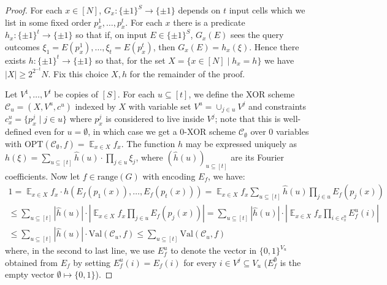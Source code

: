 \documentclass[11pt]{article}
\newcommand{\B}{\{0,1\}}
\newcommand{\rng}{\mathrm{range}}
\newcommand{\E}{\mathop{\mathbb{E}}}
\newcommand{\Opt}{\mathrm{OPT}}
\newcommand{\N}{[N]}
\begin{document}
\begin{proof}
For each $x \in \N$, $G_x: \{\pm 1\}^S \to \{\pm 1\}$ depends on $t$ input cells which we list in some fixed order $p_x^1,\ldots,p_x^t$. For each $x$ there is a predicate $h_x: \{\pm 1\}^t \to \{\pm 1\}$ so that if, on input $E \in \{\pm 1\}^S$, $G_x(E)$ sees the query outcomes $\xi_1 =E(p^1_x),\ldots, \xi_t=E(p_x^t)$, then $G_x(E) = h_x(\xi)$. Hence there exists $h: \{\pm 1\}^t \to \{\pm 1\}$ so that, for the set $X = \{ x\in \N\mid h_x = h\}$ we have $|X| \geq 2^{2^{-t}}N$. Fix this choice $X,h$ for the remainder of the proof.

Let $V^1,\ldots,V^t$ be copies of $[S]$. For each $u \subseteq [t]$, we define the XOR scheme $\mathcal{C}_u = (X,V^u,c^u)$ indexed by $X$ with variable set $V^u=\cup_{j \in u} V^j$ and constraints $c^u_x = \{p^j_x \mid j \in u\}$ where $p^j_x$ is considered to live inside $V^j$; note that this is well-defined even for $u = \emptyset$, in which case we get a $0$-XOR scheme $\mathcal{C}_\emptyset$ over 0 variables with $\Opt(\mathcal{C}_\emptyset,f) = \E_{x \in X} f_x$. The function $h$ may be expressed uniquely as $h(\xi)= \sum_{u \subseteq [t]} \hat{h}(u) \cdot \prod_{ j \in u} \xi_j$, where $(\hat{h}(u))_{u \subseteq [t]}$ are its Fourier coefficients. Now let $f\in \rng(G)$ with encoding $E_f$, we have:
\begin{gather*}
1 = \E_{x \in X} f_x \cdot h(E_f(p_1(x)),\ldots,E_f(p_t(x)))
= \E_{x \in X} f_x \sum_{u \subseteq [t]} \hat{h}(u) \prod_{j \in u} E_f(p_j(x)) \\
\leq  \sum_{u \subseteq [t]} |\hat{h}(u)| \cdot |\E_{x \in X} f_x \prod_{j \in u} E_f(p_j(x))|  
=  \sum_{u \subseteq [t]} |\hat{h}(u)| \cdot |\E_{x \in X} f_x \prod_{i\in c^u_x} E^u_f(i)|\\
\leq   \sum_{u \subseteq [t]} |\hat{h}(u)| \cdot \mathrm{Val}(\mathcal{C}_u, f)
\leq  \sum_{u \subseteq [t]} \mathrm{Val}(\mathcal{C}_u, f)
\end{gather*}
where, in the second to last line, we use $E_f^u$ to denote the vector in $\B^{V_u}$ obtained from $E_f$ by setting $E_f^u(i) = E_f(i)$ for every $i \in V^j \subseteq V_u$ ($E_f^\emptyset$ is the empty vector $\emptyset \mapsto \B$).

\end{proof}
\end{document}

